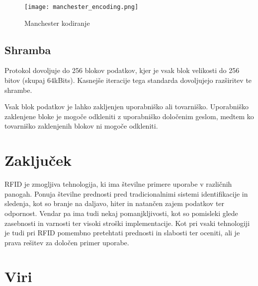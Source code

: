 \documentclass[]{article}
\begin{document}
\begin{figure}[H] %
  \centering
  \texttt{[image: manchester\_encoding.png]}
  \caption{Manchester kodiranje}
\end{figure}

\subsection{Shramba}
Protokol dovoljuje do 256 blokov podatkov, kjer je vsak blok
velikosti do 256 bitov (skupaj 64kBits). Kasnej\v{s}e iteracije
tega standarda dovoljujejo raz\v{s}iritev te shrambe.

Vsak blok podatkov je lahko zakljenjen uporabni\v{s}ko ali
tovarni\v{s}ko. Uporabni\v{s}ko zaklenjene bloke je mogo\v{c}e
odkleniti z uporabni\v{s}ko dolo\v{c}enim geslom, medtem ko
tovarni\v{s}ko zaklenjenih blokov ni mogo\v{c}e odkleniti.

\clearpage
\section{Zaklju\v{c}ek}
RFID je zmogljiva tehnologija, ki ima \v{s}tevilne primere uporabe v
razli\v{c}nih panogah. Ponuja \v{s}tevilne prednosti pred
tradicionalnimi sistemi identifikacije in sledenja, kot so branje na
daljavo, hiter in natan\v{c}en zajem podatkov ter odpornost. Vendar
pa ima tudi nekaj pomanjkljivosti, kot so pomisleki glede zasebnosti
in varnosti ter visoki stro\v{s}ki implementacije. Kot pri vsaki
tehnologiji je tudi pri RFID pomembno pretehtati prednosti in
slabosti ter oceniti, ali je prava re\v{s}itev za dolo\v{c}en primer
uporabe.

\clearpage

\section{Viri}
\printbibliography[heading=none] %
\end{document}
